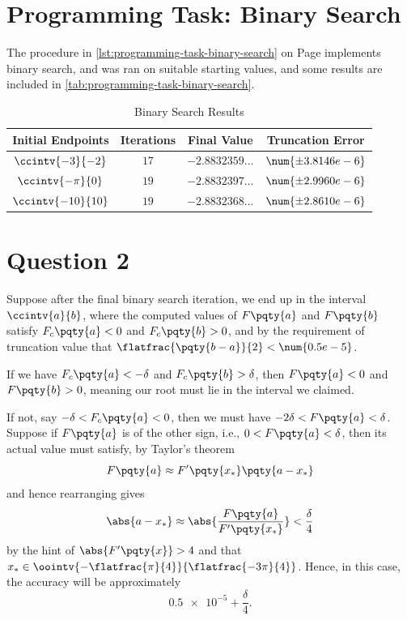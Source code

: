 \documentclass{article}
\begin{document}
\section{Programming Task: Binary Search}

The procedure in \autoref{lst:programming-task-binary-search} on Page \pageref{lst:programming-task-binary-search} implements binary search, and was ran on suitable starting values, and some results are included in \autoref{tab:programming-task-binary-search}.

\begin{table}[ht!]
    \centering
    \caption{Binary Search Results}
    \begin{tabular}{cccc}
        \toprule
        Initial Endpoints & Iterations & Final Value & Truncation Error \\
        \midrule
        \(\ccintv{-3}{-2}\) & \(17\) & \(-2.8832359\ldots\) & \(\num{\pm 3.8146e-6}\) \\
        \(\ccintv{-\pi}{0}\) & \(19\) & \(-2.8832397\ldots\) & \(\num{\pm 2.9960e-6}\) \\
        \(\ccintv{-10}{10}\) & \(19\) & \(-2.8832368\ldots\) & \(\num{\pm 2.8610e-6}\) \\
        \bottomrule
    \end{tabular}
    \label{tab:programming-task-binary-search}
\end{table}

\section{Question 2}

Suppose after the final binary search iteration, we end up in the interval \(\ccintv{a}{b}\), where the computed values of \(F\pqty{a}\) and \(F\pqty{b}\) satisfy \(F_c\pqty{a} < 0\) and \(F_c\pqty{b} > 0\), and by the requirement of truncation value that \(\flatfrac{\pqty{b - a}}{2} < \num{0.5e-5}\).

If we have \(F_c\pqty{a} < - \delta\) and \(F_c\pqty{b} > \delta\), then \(F\pqty{a} < 0\) and \(F\pqty{b} > 0\), meaning our root must lie in the interval we claimed.

If not, say \(-\delta < F_c\pqty{a} < 0\), then we must have \(-2 \delta < F\pqty{a} < \delta\). Suppose if \(F\pqty{a}\) is of the other sign, i.e., \(0 < F \pqty{a} < \delta\), then its actual value must satisfy, by Taylor's theorem
\begin{equation}
    F\pqty{a} \approx F'\pqty{x_{\ast}} \pqty{a - x_{\ast}}
\end{equation}
and hence rearranging gives
\begin{equation}
    \abs{a - x_{\ast}} \approx \abs{\frac{F\pqty{a}}{F'\pqty{x_{\ast}}}} < \frac{\delta}{4}
\end{equation}
by the hint of \(\abs{F'\pqty{x}} > 4\) and that \(x_{\ast} \in \oointv{-\flatfrac{\pi}{4}}{\flatfrac{-3\pi}{4}}\). Hence, in this case, the accuracy will be approximately
\begin{equation}
    \num{0.5e-5} + \frac{\delta}{4}.
\end{equation}
\end{document}
